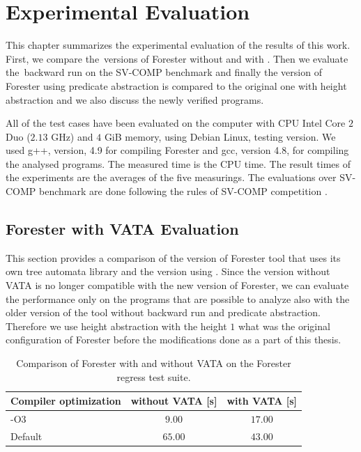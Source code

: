 \chapter{Experimental Evaluation}
\label{ch:eval}

This chapter summarizes the experimental evaluation of the results of this work.
First, we compare the~versions of Forester without and with \vata.
Then we evaluate the~backward run on the SV-COMP benchmark
and finally the version of Forester using predicate abstraction is compared to the
original one with height abstraction and we also discuss the newly verified programs.

All of the test cases have been evaluated on the computer with CPU Intel Core $2$ Duo ($2.13$ GHz)
and $4$ GiB memory, using Debian Linux, testing version.
We used g++, version, 4.9 for compiling Forester and gcc, version 4.8,
for compiling the analysed programs.
The measured time is the CPU time.
The result times of the experiments are the averages of the five measurings.
The evaluations over SV-COMP benchmark are done following the rules of
SV-COMP competition \cite{www:svcomp}.

\section{Forester with VATA Evaluation}

This section provides a comparison of the version of Forester tool
that uses its own tree automata library and the version using \vata.
Since the version without VATA is no longer compatible with the
new version of Forester, we can evaluate the performance only
on the programs that are possible to analyze also with the older
version of the tool without backward run and predicate abstraction.
Therefore we use height abstraction with the height $1$
what was the original configuration of Forester before the
modifications done as a part of this thesis.

\begin{table}[bt]
	\vskip6pt
	\caption{Comparison of Forester with and without VATA on the Forester regress test suite.
	}
	\centering
	\begin{tabular}{|l | c | c |}
		\hline
		Compiler optimization & without VATA [s] & with VATA [s] \\
		\hline
		\hline
		-O3        & $9.00$ & $17.00$ \\
		\hline
		Default    & $65.00$ & $43.00$ \\
		\hline
	\end{tabular}
	\label{tab:vataregre}
\end{table}

